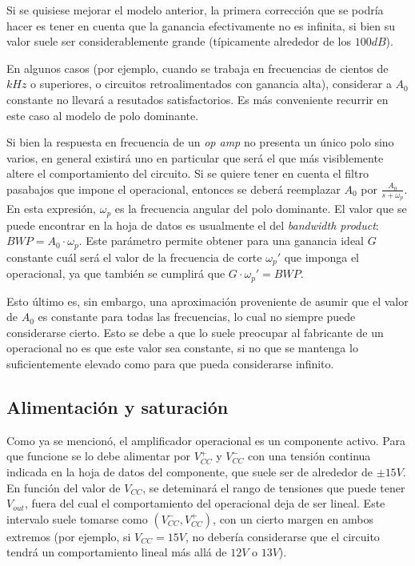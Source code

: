 \documentclass[main.tex]{subfiles}
\begin{document}
Si se quisiese mejorar el modelo anterior, la primera correcci\'on que se podr\'ia hacer es tener en cuenta que la ganancia efectivamente no es infinita, si bien su valor suele ser considerablemente grande (t\'ipicamente alrededor de los $100dB$). \par

En algunos casos (por ejemplo, cuando se trabaja en frecuencias de cientos de $kHz$ o superiores, o circuitos retroalimentados con ganancia alta), considerar a $A_0$ constante no llevar\'a a resutados satisfactorios. Es m\'as conveniente recurrir en este caso al modelo de polo dominante.\par

Si bien la respuesta en frecuencia de un \textit{op amp} no presenta un \'unico polo sino varios, en general existir\'a uno en particular que ser\'a el que m\'as visiblemente altere el comportamiento del circuito. Si se quiere tener en cuenta el filtro pasabajos que impone el operacional, entonces se deber\'a reemplazar $A_0$ por $\frac{A_0}{s+\omega_p}$. En esta expresi\'on, $\omega_p$ es la frecuencia angular del polo dominante. El valor que se puede encontrar en la hoja de datos es usualmente el del \textit{bandwidth product}: $BWP=A_0 \cdot \omega_p$. Este par\'ametro permite obtener para una ganancia ideal $G$ constante cu\'al ser\'a el valor de la frecuencia de corte $\omega_p'$ que imponga el operacional, ya que tambi\'en se cumplir\'a que $G \cdot \omega_p' = BWP$.\par

 Esto \'ultimo es, sin embargo, una aproximaci\'on proveniente de asumir que el valor de $A_0$ es constante para todas las frecuencias, lo cual no siempre puede considerarse cierto. Esto se debe a que lo suele preocupar al fabricante de un operacional no es que este valor sea constante, si no que se mantenga lo suficientemente elevado como para que pueda considerarse infinito. \par


\subsection{Alimentaci\'on y saturaci\'on}
Como ya se mencion\'o, el amplificador operacional es un componente activo. Para que funcione se lo debe alimentar por $V_{CC} ^+$ y $V_{CC} ^-$ con una tensi\'on continua indicada en la hoja de datos del componente, que suele ser de alrededor de $\pm 15V$. En funci\'on del valor de $V_{CC}$, se deteminar\'a el rango de tensiones que puede tener $V_{out}$, fuera del cual el comportamiento del operacional deja de ser lineal. Este intervalo suele tomarse como $(V_{CC} ^-, V_{CC} ^+)$, con un cierto margen en ambos extremos (por ejemplo, si $V_{CC}=15V$, no deber\'ia considerarse que el circuito tendr\'a un comportamiento lineal m\'as all\'a de $12V$ o $13V$).
\end{document}
